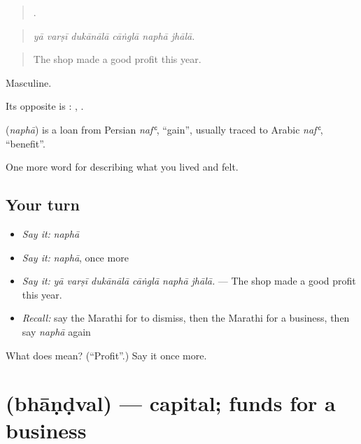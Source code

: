 \begin{quote}
     .
\end{quote}

\begin{quote}
\emph{yā varṣī dukānālā cāṅglā naphā jhālā.}
\end{quote}

\begin{quote}
The shop made a good profit this year.
\end{quote}

Masculine.

Its opposite is :  ,  .

\begin{cousinweb}
\textbf{} (\emph{naphā}) is a loan from Persian \emph{nafʿ}, \textquotedblleft{}gain\textquotedblright{}, usually traced to Arabic \emph{nafʿ}, \textquotedblleft{}benefit\textquotedblright{}.
\end{cousinweb}

\begin{grammarlens}[title={What you've built}]
One more word for describing what you lived and felt.
\end{grammarlens}

\subsection*{Your turn}
\begin{itemize}
\raggedright
  \item \emph{Say it:} \emph{naphā}
  \item \emph{Say it:} \emph{naphā}, once more
  \item \emph{Say it:} \emph{yā varṣī dukānālā cāṅglā naphā jhālā.} — The shop made a good profit this year.
  \item \emph{Recall:} say the Marathi for to dismiss, then the Marathi for a business, then say \emph{naphā} again
\end{itemize}

\begin{tcolorbox}[breakable,colback=teal!4,colframe=teal!35!black,title={Before you move on}]
What does  mean? (\textquotedblleft{}Profit\textquotedblright{}.) Say it once more.
\end{tcolorbox}
\section[\texorpdfstring{\mr{भांडवल} (bhāṇḍval)}{भांडवल (bhāṇḍval)}]{ (bhāṇḍval) — capital; funds for a business}

